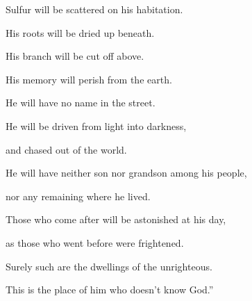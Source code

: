 {\par }{\QB Sulfur will be scattered on his habitation.
\par }{\Q {}His roots will be dried up beneath.
\par }{\QB His branch will be cut off above.
\par }{\Q {}His memory will perish from the earth.
\par }{\QB He will have no name in the street.
\par }{\Q {}He will be driven from light into darkness,
\par }{\QB and chased out of the world.
\par }{\Q {}He will have neither son nor grandson among his people,
\par }{\QB nor any remaining where he lived.
\par }{\Q {}Those who come after will be astonished at his day,
\par }{\QB as those who went before were frightened.
\par }{\Q {}Surely such are the dwellings of the unrighteous.
\par }{\QB This is the place of him who doesn’t know God.”

}
